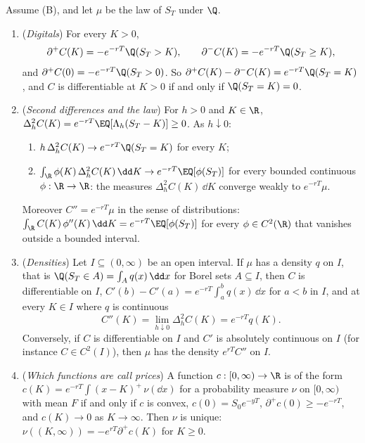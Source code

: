 \begin{theorem}\label{thm:sk-breeden-litzenberger}
Assume (B), and let $\mu$ be the law of $S_T$ under $\Q$.
\begin{enumerate}[label=(\roman*)]
  \item (\emph{Digitals}) For every $K>0$,
    \[
      \partial^+C(K)=-e^{-rT}\Q(S_T>K),\qquad \partial^-C(K)=-e^{-rT}\Q(S_T\ge K),
    \]
    and $\partial^+C(0)=-e^{-rT}\Q(S_T>0)$. So $\partial^+C(K)-\partial^-C(K)=e^{-rT}\Q(S_T=K)$, and $C$ is
    differentiable at $K>0$ if and only if $\Q(S_T=K)=0$.
  \item (\emph{Second differences and the law}) For $h>0$ and $K\in\R$,
    $\Delta_h^2C(K)=e^{-rT}\EQ[\Lambda_h(S_T-K)]\ge0$. As $h\downarrow0$:
    \begin{enumerate}[label=(\alph*)]
      \item $h\,\Delta_h^2C(K)\to e^{-rT}\Q(S_T=K)$ for every $K$;
      \item $\int_\R\phi(K)\,\Delta_h^2C(K)\,\dd K\to e^{-rT}\EQ[\phi(S_T)]$ for every bounded continuous
        $\phi:\R\to\R$: the measures $\Delta_h^2C(K)\,\dd K$ converge weakly to $e^{-rT}\mu$.
    \end{enumerate}
    Moreover $C''=e^{-rT}\mu$ in the sense of distributions:
    $\int_\R C(K)\,\phi''(K)\,\dd K=e^{-rT}\EQ[\phi(S_T)]$ for every $\phi\in C^2(\R)$ that vanishes
    outside a bounded interval.
  \item (\emph{Densities}) Let $I\subseteq(0,\infty)$ be an open interval. If $\mu$ has a density $q$
    on $I$, that is $\Q(S_T\in A)=\int_Aq(x)\,\dd x$ for Borel sets $A\subseteq I$, then $C$ is
    differentiable on $I$, $C'(b)-C'(a)=e^{-rT}\int_a^bq(x)\,\dd x$ for $a<b$ in $I$, and at every
    $K\in I$ where $q$ is continuous
    \[
      C''(K)=\lim_{h\downarrow0}\Delta_h^2C(K)=e^{-rT}q(K).
    \]
    Conversely, if $C$ is differentiable on $I$ and $C'$ is absolutely continuous on $I$ (for
    instance $C\in C^2(I)$), then $\mu$ has the density $e^{rT}C''$ on $I$.
  \item (\emph{Which functions are call prices}) A function $c:[0,\infty)\to\R$ is of the form
    $c(K)=e^{-rT}\int(x-K)^+\,\nu(\dd x)$ for a probability measure $\nu$ on $[0,\infty)$ with mean
    $F$ if and only if $c$ is convex, $c(0)=S_0e^{-yT}$, $\partial^+c(0)\ge-e^{-rT}$, and $c(K)\to0$ as
    $K\to\infty$. Then $\nu$ is unique: $\nu((K,\infty))=-e^{rT}\partial^+c(K)$ for $K\ge0$.
\end{enumerate}
\end{theorem}

